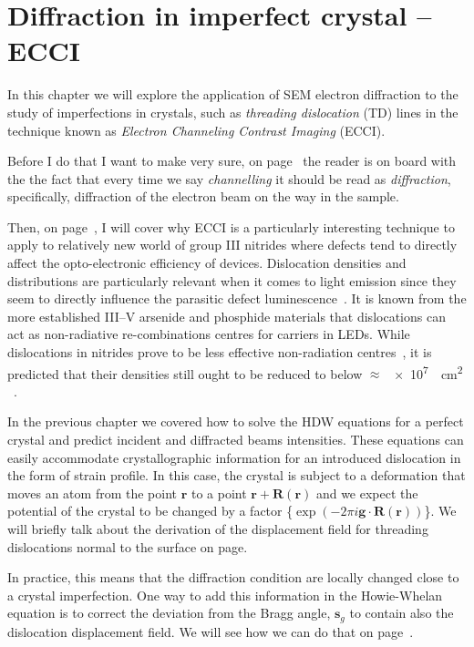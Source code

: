 \chapter{Diffraction in imperfect crystal -- ECCI}
\label{chap:ECCI}

In this chapter we will explore the application of SEM  electron diffraction to the study of imperfections in crystals, such as \textit{threading dislocation} (TD) lines in the technique known as \textit{Electron Channeling Contrast Imaging} (ECCI). 

Before I do that I want to make very sure, on page~\pageref{sec:channelling} the reader is on board with the the fact that every time we say \emph{channelling} it should be read as \emph{diffraction}, specifically, diffraction of the electron beam on the way in the sample.

Then, on page~\pageref{sec:ECCITDmotivation},  I will cover why ECCI is a particularly interesting technique to apply to relatively new world of group III nitrides where defects tend to directly affect the opto-electronic efficiency of devices. Dislocation densities and distributions are particularly relevant when it comes to light emission since they seem to directly influence the parasitic defect luminescence~\cite{Gunnar}. It is known from the more established III–V arsenide and phosphide materials that dislocations can act as non-radiative re-combinations centres for carriers in LEDs. While dislocations in nitrides prove to be less effective non-radiation centres~\cite{Lester95}, it is predicted that their densities still ought to be reduced to below $\approx$ \SI{e7}{\per \centi \meter^{2}} ~\cite{Karpov02}.


In the previous chapter we covered how to solve the HDW equations for a perfect crystal and predict incident and diffracted beams intensities.  These equations can easily accommodate crystallographic information for an introduced dislocation in the form of strain profile. In this case, the  crystal is subject to a deformation that moves an atom from the point $\textbf{r}$ to a point $\textbf{r}+\textbf{R}(\textbf{r})$ and we expect  the potential of the crystal to be  changed by a factor \{$\exp(-2\pi i \textbf{g}\cdot \textbf{R}(\textbf{r}))$\}.  We will briefly talk about the derivation of the displacement field for threading dislocations normal to the surface on page\pageref{sec:strain}.

In practice, this means that the diffraction condition are locally changed close to a crystal imperfection. One way to add this information in the Howie-Whelan equation is to correct the deviation from the Bragg angle, $\textbf{s}_g$ to contain also the dislocation displacement field. We will see how we can do that on page~\pageref{sec:beta}.

